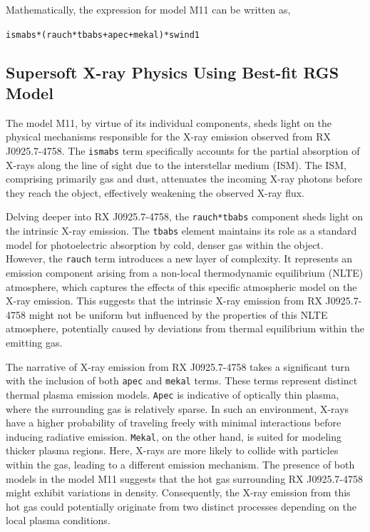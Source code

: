 			Mathematically, the expression for model M11 can be written as,
			\begin{center}
				\texttt{ismabs*(rauch*tbabs+apec+mekal)*swind1}
			\end{center}
			
		\subsection{Supersoft X-ray Physics Using Best-fit RGS Model}
			The model M11, by virtue of its individual components, sheds light on the physical mechanisms responsible for the X-ray emission observed from RX J0925.7-4758. The \texttt{ismabs} term specifically accounts for the partial absorption of X-rays along the line of sight due to the interstellar medium (ISM). The ISM, comprising primarily gas and dust, attenuates the incoming X-ray photons before they reach the object, effectively weakening the observed X-ray flux.
			
			Delving deeper into RX J0925.7-4758, the \texttt{rauch*tbabs} component sheds light on the intrinsic X-ray emission. The \texttt{tbabs} element maintains its role as a standard model for photoelectric absorption by cold, denser gas within the object. However, the \texttt{rauch} term introduces a new layer of complexity. It represents an emission component arising from a non-local thermodynamic equilibrium (NLTE) atmosphere, which captures the effects of this specific atmospheric model on the X-ray emission. This suggests that the intrinsic X-ray emission from RX J0925.7-4758 might not be uniform but influenced by the properties of this NLTE atmosphere, potentially caused by deviations from thermal equilibrium within the emitting gas.
			
			The narrative of X-ray emission from RX J0925.7-4758 takes a significant turn with the inclusion of both \texttt{apec} and \texttt{mekal} terms. These terms represent distinct thermal plasma emission models. \texttt{Apec} is indicative of optically thin plasma, where the surrounding gas is relatively sparse. In such an environment, X-rays have a higher probability of traveling freely with minimal interactions before inducing radiative emission. \texttt{Mekal}, on the other hand, is suited for modeling thicker plasma regions. Here, X-rays are more likely to collide with particles within the gas, leading to a different emission mechanism. The presence of both models in the model M11 suggests that the hot gas surrounding RX J0925.7-4758 might exhibit variations in density. Consequently, the X-ray emission from this hot gas could potentially originate from two distinct processes depending on the local plasma conditions.
			
